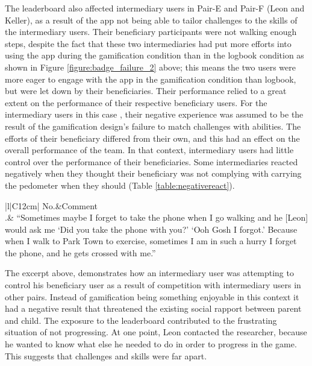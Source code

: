 The leaderboard also affected intermediary users in Pair-E and Pair-F (Leon and Keller), as a result of the app not being able to tailor challenges to the skills of the intermediary users. Their beneficiary participants were not walking enough steps, despite the fact that these two intermediaries had put more efforts into using the app during the gamification condition than in the logbook condition as shown in Figure \ref{figure:badge_failure_2} above; this means the two users were more eager to engage with the app in the gamification condition than logbook, but were let down by their beneficiaries. Their performance relied to a great extent on the performance of their respective beneficiary users. For the intermediary users in this case , their negative experience was assumed to be the result of the gamification design's failure to match challenges with abilities. The efforts of their beneficiary differed from their own, and this had an effect on the overall performance of the team. In that context, intermediary users had little control over the performance of their beneficiaries. Some intermediaries reacted negatively when they thought their beneficiary was not complying with carrying the pedometer when they should (Table \ref{table:negativereact}). 

\begin{table}[h!]
\renewcommand{\baselinestretch}{1.5}
  \begin{center}
    \caption{Excerpt: an example of negative reaction that threatened the social relationship between members of a pair.}
    \label{table:negativereact}
	\begin{tabular}{|l|C{12cm}|}
		\hline
		No.&Comment\\
		.& {``Sometimes maybe I forget to take the phone when I go walking and he [Leon] would ask me `Did you take the phone with you?' `Ooh Gosh I forgot.'  Because when I walk to Park Town to exercise, sometimes  I am in such a hurry I forget the phone, and he gets crossed with me.''}\\
		\hline
	\end{tabular}
  \end{center}
\end{table} 

The excerpt above, demonstrates how an intermediary user was attempting to control his beneficiary user as a result of competition with intermediary users in other pairs. Instead of gamification being something enjoyable in this context it had a negative result that threatened the existing social rapport between parent and child. The exposure to the leaderboard contributed to the frustrating situation of not progressing. At one point, Leon contacted the researcher, because he wanted to know what else he needed to do in order to progress in the game. This suggests that challenges and skills were far apart.


